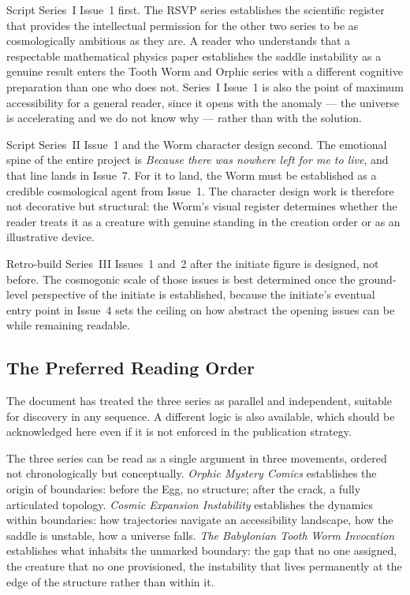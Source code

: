 \documentclass[12pt, a4paper]{article}
\begin{document}
Script Series~I Issue~1 first. The RSVP series establishes the scientific register that provides the intellectual permission for the other two series to be as cosmologically ambitious as they are. A reader who understands that a respectable mathematical physics paper establishes the saddle instability as a genuine result enters the Tooth Worm and Orphic series with a different cognitive preparation than one who does not. Series~I Issue~1 is also the point of maximum accessibility for a general reader, since it opens with the anomaly --- the universe is accelerating and we do not know why --- rather than with the solution.

Script Series~II Issue~1 and the Worm character design second. The emotional spine of the entire project is \textit{Because there was nowhere left for me to live}, and that line lands in Issue~7. For it to land, the Worm must be established as a credible cosmological agent from Issue~1. The character design work is therefore not decorative but structural: the Worm's visual register determines whether the reader treats it as a creature with genuine standing in the creation order or as an illustrative device.

Retro-build Series~III Issues~1 and~2 after the initiate figure is designed, not before. The cosmogonic scale of those issues is best determined once the ground-level perspective of the initiate is established, because the initiate's eventual entry point in Issue~4 sets the ceiling on how abstract the opening issues can be while remaining readable.

\subsection{The Preferred Reading Order}

The document has treated the three series as parallel and independent, suitable for discovery in any sequence. A different logic is also available, which should be acknowledged here even if it is not enforced in the publication strategy.

The three series can be read as a single argument in three movements, ordered not chronologically but conceptually. \textit{Orphic Mystery Comics} establishes the origin of boundaries: before the Egg, no structure; after the crack, a fully articulated topology. \textit{Cosmic Expansion Instability} establishes the dynamics within boundaries: how trajectories navigate an accessibility landscape, how the saddle is unstable, how a universe falls. \textit{The Babylonian Tooth Worm Invocation} establishes what inhabits the unmarked boundary: the gap that no one assigned, the creature that no one provisioned, the instability that lives permanently at the edge of the structure rather than within it.
\end{document}
